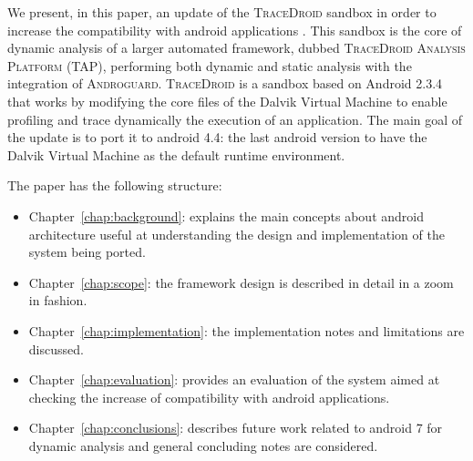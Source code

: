 We present, in this paper, an update of the \textsc{TraceDroid} sandbox in
order to increase the compatibility with android applications
\cite{ref1}. This sandbox is the core of dynamic analysis of a larger
automated framework, dubbed \textsc{TraceDroid Analysis Platform (TAP)},
performing both dynamic and static analysis with the integration of
\textsc{Androguard}. \textsc{TraceDroid} is a sandbox based on Android 2.3.4 that works
by modifying the core files of the Dalvik Virtual Machine to enable
profiling and trace dynamically the execution of an application. The
main goal of the update is to port it to android 4.4: the last android
version to have the Dalvik Virtual Machine as the default runtime
environment.

The paper has the following structure:
\begin{itemize}
    \item Chapter~\ref{chap:background}: explains the main concepts about android
      architecture useful at understanding the design and
      implementation of the system being ported.
    \item Chapter~\ref{chap:scope}: the framework design is described in detail in a
      zoom in fashion.
    \item Chapter~\ref{chap:implementation}: the implementation notes and limitations are
      discussed.
    \item Chapter~\ref{chap:evaluation}: provides an evaluation of the system aimed at
      checking the increase of compatibility with android
      applications.
    \item Chapter~\ref{chap:conclusions}: describes future work related to android 7 for
      dynamic analysis and general concluding notes are considered.
\end{itemize}

